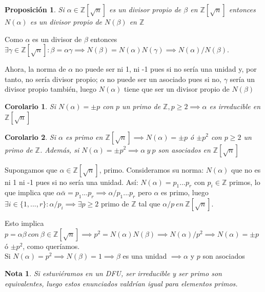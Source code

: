 \documentclass[11pt, a4paper, titlepage]{article}
\makeatletter
\newif\IfInSansMode
\let\oldsf\sffamily
\renewcommand*{\sffamily}{\oldsf\mathversion{sans}\InSansModetrue}
\let\oldnorm\normalfont
\renewcommand*{\normalfont}{\oldnorm\InSansModefalse\mathversion{normal}}
\renewenvironment{proof}[1][\proofname] {\vspace{-15pt}\par\pushQED{\qed}\normalfont\topsep6\p@\@plus6\p@\relax\trivlist\item[\hskip\labelsep\it#1\@addpunct{.}]\ignorespaces}{\popQED\endtrivlist\@endpefalse}
\providecommand{\ent}{\mathbb{Z}}
\renewenvironment{proof}[1][\proofname] {\par\pushQED{\qed}\normalfont\topsep6\p@\@plus6\p@\relax\trivlist\item[\hskip\labelsep\itshape\sffamily#1\@addpunct{.}]\ignorespaces}{\popQED\endtrivlist\@endpefalse}
\theoremstyle{theorem-style}
\newtheorem{nprop}{Proposición}[section]
\newtheorem{ncor}{Corolario}[section]
\theoremstyle{definition-style}
\theoremstyle{remark-style}
\newtheorem*{nota}{Nota}
\theoremstyle{example-style}
\makeatother
\begin{document}
\begin{nprop}
	Si $\alpha \in \ent[\sqrt n]$ es un divisor propio de $\beta$ en $\ent[\sqrt n]$ entonces $N(\alpha)$ es un divisor propio de $N(\beta)$ en $\ent$
\end{nprop}
\begin{proof}
	Como $\alpha$ es un divisor de $\beta$ entonces $\exists \gamma \in \ent[\sqrt n] : \beta = \alpha \gamma \implies N(\beta) = N(\alpha)N(\gamma) \implies N(\alpha)/N(\beta)$.

	Ahora, la norma de $\alpha$ no puede ser ni 1, ni -1 pues si no sería una unidad y, por tanto, no sería divisor propio; $\alpha$ no puede ser un asociado pues si no, $\gamma$ sería un divisor propio también, luego $N(\alpha)$ tiene que ser un divisor propio de $N(\beta)$

\end{proof}
\begin{ncor}
	Si $N(\alpha) = \pm p$ con $p $ un primo de $\ent, p\geq 2\implies \alpha$ es irreducible en $\ent[\sqrt n]$
\end{ncor}
\begin{ncor}
	Si $\alpha$ es primo en $\ent[\sqrt n]\implies N(\alpha) = \pm p $ ó $\pm p^2$ con $p \geq 2 $ un primo de $\ent$. Además, si $N(\alpha) = \pm p^2 \implies \alpha \ y \ p$ son asociados en $\ent[\sqrt n]$
\end{ncor}
\begin{proof}
	Supongamos que $\alpha \in \ent[\sqrt n]$, primo. Consideramos su norma: $N(\alpha)$ que no es ni 1 ni -1 pues si no sería una unidad. Así: $N(\alpha) = p_1...p_r$ con $p_i\in \ent$ primos, lo que implica que $\alpha \bar{\alpha} = p_1...p_r \implies \alpha/p_1...p_r $ pero $\alpha$ es primo, luego $\exists i \in \{1,...,r\}: \alpha / p_i \implies \exists p \geq 2 $ primo de $\ent$ tal que $\alpha / p \ en \ \ent[\sqrt n]$.

	 Esto implica $p = \alpha \beta \ con \ \beta \in \ent[\sqrt n] \implies p^2 = N(\alpha) N(\beta) \implies N(\alpha)/p^2 \implies N(\alpha) = \pm p$ ó $\pm p^2$, como queríamos.\\
	 Si $N(\alpha) = p^2 \implies N(\beta) = 1 \implies \beta$ es una unidad $\implies \alpha$ y $p$ son asociados
\end{proof}
\begin{nota}
	Si estuviéramos en un DFU, ser irreducible y ser primo son equivalentes, luego estos enunciados valdrían igual para elementos primos.
\end{nota}
\end{document}
